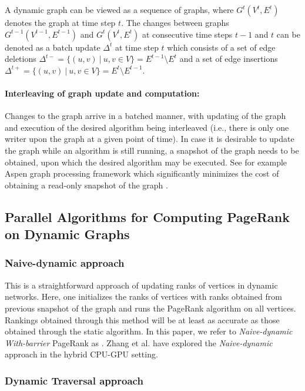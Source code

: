 A dynamic graph can be viewed as a sequence of graphs, where $G^t(V^t, E^t)$ denotes the graph at time step $t$. The changes between graphs $G^{t-1}(V^{t-1}, E^{t-1})$ and $G^t(V^t, E^t)$ at consecutive time steps $t-1$ and $t$ can be denoted as a batch update $\Delta^t$ at time step $t$ which consists of a set of edge deletions $\Delta^{t-} = \{(u, v)\ |\ u, v \in V\} = E^{t-1} \setminus E^t$ and a set of edge insertions $\Delta^{t+} = \{(u, v)\ |\ u, v \in V\} = E^t \setminus E^{t-1}$.

\paragraph{Interleaving of graph update and computation:}

Changes to the graph arrive in a batched manner, with updating of the graph and execution of the desired algorithm being interleaved (i.e., there is only one writer upon the graph at a given point of time). In case it is desirable to update the graph while an algorithm is still running, a snapshot of the graph needs to be obtained, upon which the desired algorithm may be executed. See for example Aspen graph processing framework which significantly minimizes the cost of obtaining a read-only snapshot of the graph \cite{graph-dhulipala19}.




\subsection{Parallel Algorithms for Computing PageRank on Dynamic Graphs}

\subsubsection{Naive-dynamic approach \cite{rank-zhang17}}
\label{sec:about-naive}

This is a straightforward approach of updating ranks of vertices in dynamic networks. Here, one initializes the ranks of vertices with ranks obtained from previous snapshot of the graph and runs the PageRank algorithm on all vertices. Rankings obtained through this method will be at least as accurate as those obtained through the static algorithm. In this paper, we refer to \textit{Naive-dynamic With-barrier} PageRank as \NaiWbar{}. Zhang et al. \cite{rank-zhang17} have explored the \textit{Naive-dynamic} approach in the hybrid CPU-GPU setting.


\subsubsection{Dynamic Traversal approach \cite{rank-desikan05, rank-giri20}}
\label{sec:about-traversal}

